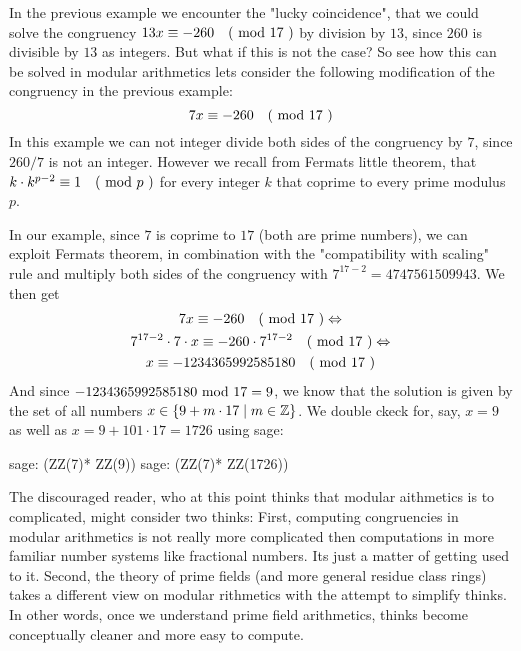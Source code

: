 \begin{example} In the previous example we encounter the "lucky coincidence", that we could solve the congruency $13x \equiv -260 \quad \text{( mod } 17 \text{ )}$ by division by $13$, since $260$ is divisible by $13$ as integers. But what if this is not the case?
So see how this can be solved in modular arithmetics lets consider the following modification of the congruency in the previous example:
$$
7x \equiv -260 \quad \text{( mod } 17 \text{ )}
$$ 
In this example we can not integer divide both sides of the congruency by $7$, since $260/7$ is not an integer. However we recall from Fermats little theorem, that $k\cdot k^{p-2} \equiv 1 \quad \text{( mod } p \text{ )}$ for every integer $k$ that coprime to every prime modulus $p$. 

In our example, since $7$ is coprime to $17$ (both are prime numbers), we can exploit Fermats theorem, in combination with the "compatibility with scaling" rule and multiply both sides of the congruency with $7^{17-2}= 4747561509943$. We then get
\begin{multline*}
7x \equiv -260 \quad \text{( mod } 17 \text{ )} \Leftrightarrow \\
7^{17-2}\cdot 7\cdot x \equiv -260\cdot 7^{17-2} \quad \text{( mod } 17 \text{ )}\Leftrightarrow \\
x \equiv -1234365992585180 \quad \text{( mod } 17 \text{ )} 
\end{multline*}
And since $-1234365992585180 \text{ mod } 17=9$, we know that the solution is given by the set of all numbers $x\in \{9+m\cdot 17\;|\; m\in\mathbb{Z}\}$. We double ckeck for, say, $x=9$ as well as $x=9 + 101\cdot 17 = 1726$ using sage:
\begin{sagecommandline}
sage: (ZZ(7)* ZZ(9))  %
sage: (ZZ(7)* ZZ(1726))  %
\end{sagecommandline}
\end{example}
\begin{remark}
The discouraged reader, who at this point thinks that modular aithmetics is to complicated, might consider two thinks: First, computing congruencies in modular arithmetics is not really more complicated then computations in more familiar number systems like fractional numbers. Its just a matter of getting used to it. Second, the theory of prime fields (and more general residue class rings) takes a different view on modular rithmetics with the attempt to simplify thinks. In other words, once we understand prime field arithmetics, thinks become conceptually cleaner and more easy to compute.
\end{remark}
